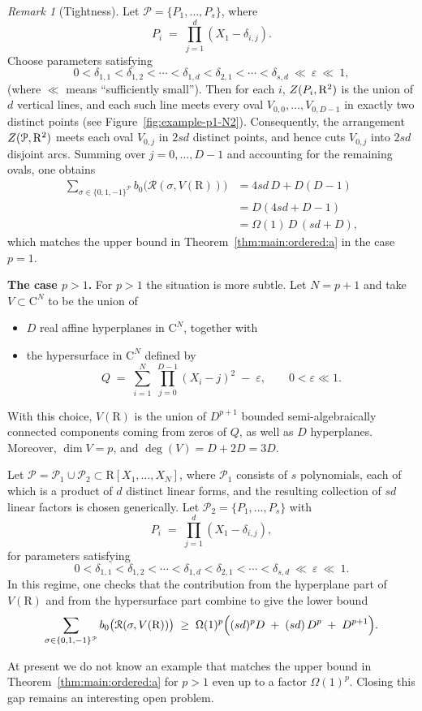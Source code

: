 \documentclass[10pt]{amsart}
\theoremstyle{definition}
\theoremstyle{remark}
\newtheorem{remark}{Remark}
\numberwithin{equation}{section}
\newcommand {\R} {\mathrm{R}}
\newcommand {\C}     {\mathrm{C}}
\newcommand {\ZZ} {{\rm Z}}
\newcommand {\RR} {{\mathcal R}}
\begin{document}
\begin{remark}[Tightness]
Let $\mathcal P=\{P_1,\dots,P_s\}$, where
\[
P_i \;=\; \prod_{j=1}^{d}(X_1-\delta_{i,j}).
\]
Choose parameters satisfying
\[
0<\delta_{1,1}<\delta_{1,2}<\cdots<\delta_{1,d}<\delta_{2,1}<\cdots<\delta_{s,d}
\ \ll\ \varepsilon\ \ll\ 1,
\]
(where $\ll$ means ``sufficiently small'').  Then for each $i$,
$\ZZ(P_i,\R^2)$ is the union of $d$ vertical lines, and each such line meets every oval
$V_{0,0},\dots,V_{0,D-1}$ in exactly two distinct points
(see Figure~\ref{fig:example-p1-N2}).  Consequently, the arrangement
$\ZZ(\mathcal P,\R^2)$ meets each oval $V_{0,j}$ in $2sd$ distinct points, and hence
cuts $V_{0,j}$ into $2sd$ disjoint arcs.  Summing over $j=0,\dots,D-1$ and accounting
for the remaining ovals, one obtains
\begin{align*}
\sum_{\sigma\in\{0,1,-1\}^{\mathcal P}} b_0\bigl(\RR(\sigma,V(\R))\bigr)
&= 4sd\,D + D(D-1) \\
&= D(4sd + D - 1) \\
&= \Omega(1)\,D\,(sd + D),
\end{align*}
which matches the upper bound in Theorem~\ref{thm:main:ordered:a} in the case $p=1$.

\smallskip
\noindent\textbf{The case $p>1$.}
For $p>1$ the situation is more subtle.  Let $N=p+1$ and take $V\subset \C^N$ to be the
union of
\begin{itemize}
\item $D$ real affine hyperplanes in $\C^N$, together with
\item the hypersurface in $\C^N$ defined by
\[
Q \;=\; \sum_{i=1}^{N}\ \prod_{j=0}^{D-1}(X_i-j)^2\;-\;\varepsilon,
\qquad 0<\varepsilon\ll 1.
\]
\end{itemize}
With this choice, $V(\R)$ is the union of  $D^{p+1}$ bounded semi-algebraically connected
components coming from zeros of $Q$, as well as $D$ hyperplanes. Moreover,
$\dim V = p$, and $\deg(V) = D + 2 D = 3 D$. 

Let $\mathcal P=\mathcal P_1\cup\mathcal P_2\subset \R[X_1,\dots,X_N]$, where
$\mathcal P_1$ consists of $s$ polynomials, each of which is a product of $d$
distinct linear forms, and the resulting collection of $sd$ linear factors is chosen
generically.  Let $\mathcal P_2=\{P_1,\dots,P_s\}$ with
\[
P_i \;=\; \prod_{j=1}^{d}(X_1-\delta_{i,j}),
\]
for parameters satisfying
\[
0<\delta_{1,1}<\delta_{1,2}<\cdots<\delta_{1,d}<\delta_{2,1}<\cdots<\delta_{s,d}
\ \ll\ \varepsilon\ \ll\ 1.
\]
In this regime, one checks that the contribution from the hyperplane part of $V(\R)$
and from the hypersurface part combine to give the lower bound
\[
\sum_{\sigma\in\{0,1,-1\}^{\mathcal P}} b_0\bigl(\RR(\sigma,V(\R))\bigr)
\;\ge\;
\Omega(1)^p\Bigl((sd)^p D \;+\; (sd)\,D^p \;+\; D^{p+1}\Bigr).
\]

At present we do not know an example that matches the upper bound in
Theorem~\ref{thm:main:ordered:a} for $p>1$ even up to a factor $\Omega(1)^p$.
Closing this gap remains an interesting open problem.

\end{remark}
\end{document}
